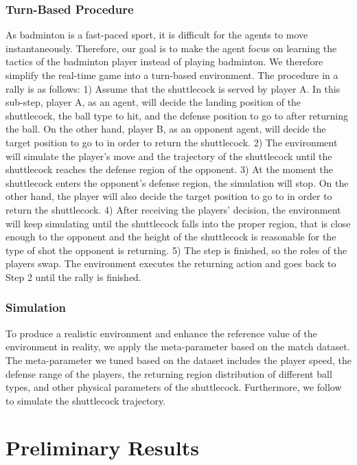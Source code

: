 \documentclass[letterpaper]{article}
\begin{document}
\subsubsection{Turn-Based Procedure}
As badminton is a fast-paced sport, it is difficult for the agents to move instantaneously.
Therefore, our goal is to make the agent focus on learning the tactics of the badminton player instead of playing badminton.
We therefore simplify the real-time game into a turn-based environment.
The procedure in a rally is as follows: 1) Assume that the shuttlecock is served by player A. In this sub-step, player A, as an agent, will decide the landing position of the shuttlecock, the ball type to hit, and the defense position to go to after returning the ball.
On the other hand, player B, as an opponent agent, will decide the target position to go to in order to return the shuttlecock.
2) The environment will simulate the player's move and the trajectory of the shuttlecock until the shuttlecock reaches the defense region of the opponent.
3) At the moment the shuttlecock enters the opponent's defense region, the simulation will stop.
On the other hand, the player will also decide the target position to go to in order to return the shuttlecock.
4) After receiving the players' decision, the environment will keep simulating until the shuttlecock falls into the proper region, that is close enough to the opponent and the height of the shuttlecock is reasonable for the type of shot the opponent is returning.
5) The step is finished, so the roles of the players swap. The environment executes the returning action and goes back to Step 2 until the rally is finished.

\subsubsection{Simulation}
To produce a realistic environment and enhance the reference value of the environment in reality, we apply the meta-parameter based on the match dataset.
The meta-parameter we tuned based on the dataset includes the player speed, the defense range of the players, the returning region distribution of different ball types, and other physical parameters of the shuttlecock.
Furthermore, we follow \cite{Chen2009ASO} to simulate the shuttlecock trajectory.

\section{Preliminary Results}
\end{document}
